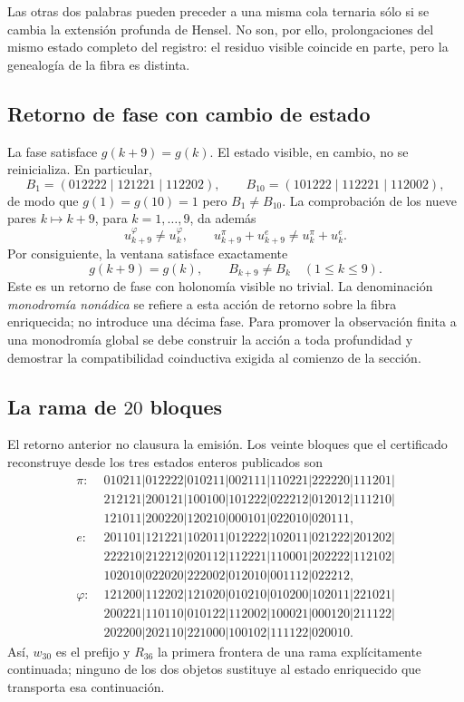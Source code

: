 Las otras dos palabras pueden preceder a una misma cola ternaria sólo si se
cambia la extensión profunda de Hensel. No son, por ello, prolongaciones del
mismo estado completo del registro: el residuo visible coincide en parte, pero
la genealogía de la fibra es distinta.

\subsection{Retorno de fase con cambio de estado}

La fase satisface \(g(k+9)=g(k)\). El estado visible, en cambio, no se
reinicializa. En particular,
\[
B_1=(012222\mid121221\mid112202),
\qquad
B_{10}=(101222\mid112221\mid112002),
\]
de modo que \(g(1)=g(10)=1\) pero \(B_1\ne B_{10}\). La comprobación de los
nueve pares \(k\mapsto k+9\), para \(k=1,\ldots,9\), da además
\[
u_{k+9}^\varphi\ne u_k^\varphi,
\qquad
u_{k+9}^\pi+u_{k+9}^e\ne u_k^\pi+u_k^e.
\]
Por consiguiente, la ventana satisface exactamente
\[
\boxed{g(k+9)=g(k),\qquad B_{k+9}\ne B_k
\quad(1\le k\le9).}
\]
Este es un retorno de fase con holonomía visible no trivial. La denominación
\emph{monodromía nonádica} se refiere a esta acción de retorno sobre la
fibra enriquecida; no introduce una décima fase. Para promover la observación
finita a una monodromía global se debe construir la acción a toda profundidad
y demostrar la compatibilidad coinductiva exigida al comienzo de la sección.

\subsection{La rama de \(20\) bloques}

El retorno anterior no clausura la emisión. Los veinte bloques que el
certificado reconstruye desde los tres estados enteros publicados son
\begin{align*}
\pi:\;&010211|012222|010211|002111|110221|222220|111201|\\
&212121|200121|100100|101222|022212|012012|111210|\\
&121011|200220|120210|000101|022010|020111,\\[2pt]
e:\;&201101|121221|102011|012222|102011|021222|201202|\\
&222210|212212|020112|112221|110001|202222|112102|\\
&102010|022020|222002|012010|001112|022212,\\[2pt]
\varphi:\;&121200|112202|121020|010210|010200|102011|221021|\\
&200221|110110|010122|112002|100021|000120|211122|\\
&202200|202110|221000|100102|111122|020010.
\end{align*}
Así, \(w_{30}\) es el prefijo y \(R_{36}\) la primera frontera de una rama
explícitamente continuada; ninguno de los dos objetos sustituye al estado
enriquecido que transporta esa continuación.

